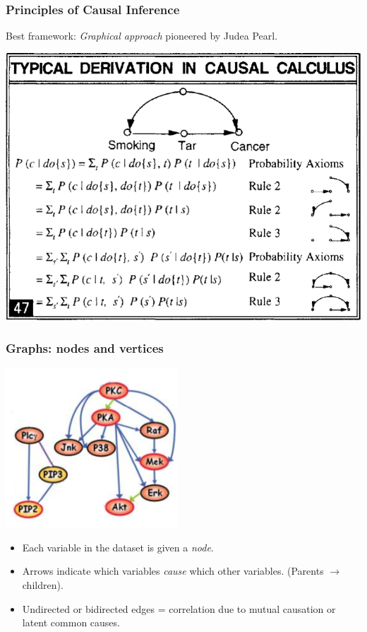 \documentclass{beamer}
\begin{document}
\begin{frame}
\frametitle{Principles of Causal Inference}

Best framework: \emph{Graphical approach} pioneered by Judea Pearl.

\begin{center}
\includegraphics[scale = 0.2]{../images/pearl47.png}
\end{center}

\end{frame}

\begin{frame}
\frametitle{Graphs: nodes and vertices}

\begin{center}
\includegraphics[scale = 0.5]{../images/cyto_result_cropped3.png}
\end{center}

\begin{itemize}
\item Each variable in the dataset is given a \emph{node}.
\item Arrows indicate which variables \emph{cause} which other variables. (Parents $\to$ children).
\item Undirected or bidirected edges = correlation due to mutual causation or latent common causes.
\end{itemize}

\end{frame}
\end{document}
